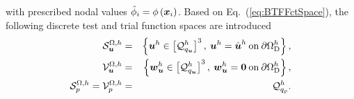 \documentclass[12pt, twoside, english]{article}
\numberwithin{equation}{section}
\newcommand{\vek}[1]{\mathchoice{\displaystyle\boldsymbol#1}
{\textstyle\boldsymbol#1}{\scriptstyle\boldsymbol#1}
{\scriptscriptstyle\boldsymbol#1}}
\begin{document}
with prescribed nodal values $\hat{\phi}_{i}=\phi\left(\vek{x}_{i}\right)$. Based on Eq.~(\ref{eq:BTFFctSpace}), the following discrete
test and trial function spaces are introduced 
\begin{eqnarray}
	\mathcal{S}_{\vek{u}}^{\Omega,h} & = & \left\{ \vek{u}^{h}\in\left[\mathcal{Q}_{q_{\vek{u}}}^{h}\right]^{3},\:\vek{u}^{h}=\hat{\vek{u}}^{h}\:\textrm{on}\:\partial\Omega_{\mathrm{D}}^{h}\right\} ,\label{eq:TrialU-1}\\
	\mathcal{V}_{\vek{u}}^{\Omega,h} & = & \left\{ \vek{w}_{\vek{u}}^{h}\in\left[\mathcal{Q}_{q_{\vek{u}}}^{h}\right]^{3},\:\vek{w}_{\vek{u}}^{h}=\vek{0}\:\textrm{on}\:\partial\Omega_{\mathrm{D}}^{h}\right\} ,\label{eq:TestU-1}\\
	\mathcal{S}_{p}^{\Omega,h}=\mathcal{V}_{p}^{\Omega,h} & = & \mathcal{Q}_{q_{p}}^{h}.\label{eq:TrialAndTestP-1}
\end{eqnarray}
\end{document}
